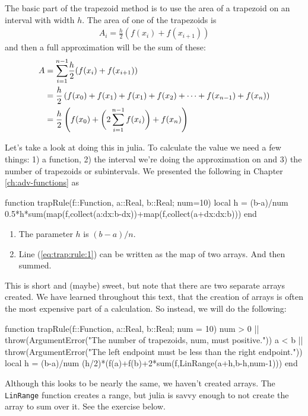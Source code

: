 The basic part of the trapezoid method is to use the area of a trapezoid on an interval with width $h$.  The area of one of the trapezoids is
%
\begin{align*}
A_i = \frac{h}{2}(f(x_i)+f(x_{i+1}))
\end{align*}
%
and then a full approximation will be the sum of these:
\begin{align}
A& ={\sum_{i=1}^{n-1}} \frac{h}{2}(f(x_i)+f(x_{i+1})) \notag \\
 & =\frac{h}{2}\left(f(x_0)+f(x_1)+f(x_1)+f(x_2)+ \cdots + f(x_{n-1})+f(x_n)\right) \label{eq:trap:rule:1} \\
 & =\frac{h}{2}\left( f(x_0) + \biggl(2\sum_{i=1}^{n-1} f(x_i) \biggr) + f(x_n)\right) \label{eq:trap:rule}
 \end{align}

Let's take a look at doing this in julia.  To calculate the value we need a few things: 1) a function, 2) the interval we're doing the approximation on and 3) the number of trapezoids or subintervals.  We presented the following in Chapter \ref{ch:adv-functions} as 
\begin{jlblock}[numint]
function trapRule(f::Function, a::Real, b::Real; num=10)
  local h = (b-a)/num
  0.5*h*sum(map(f,collect(a:dx:b-dx))+map(f,collect(a+dx:dx:b)))
end
\end{jlblock}

\begin{enumerate}
\item The parameter $h$ is $(b-a)/n$.
\item Line (\ref{eq:trap:rule:1}) can be written as the map of two arrays. And then summed. 
\end{enumerate}

This is short and (maybe) sweet, but note that there are two separate arrays created.  We have learned throughout this text, that the creation of arrays is often the most expensive part of a calculation.  So instead, we will do the following: 

\begin{jlblock}[numint]
function trapRule(f::Function, a::Real, b::Real; num = 10)
  num > 0 || throw(ArgumentError("The number of trapezoids, num, must positive."))
  a < b || throw(ArgumentError("The left endpoint must be less than the right endpoint."))
  local h = (b-a)/num
  (h/2)*(f(a)+f(b)+2*sum(f,LinRange(a+h,b-h,num-1)))
end
\end{jlblock}

Although this looks to be nearly the same, we haven't created arrays.  The \texttt{LinRange} function creates a range, but julia is savvy enough to not create the array to sum over it. See the exercise below.

